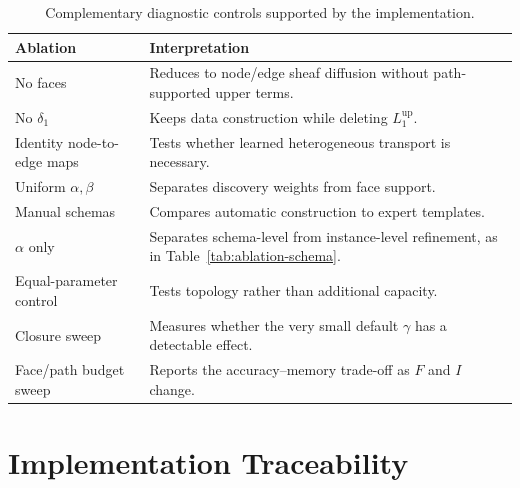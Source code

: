 \documentclass{article}
\begin{document}
\begin{table}[h]
  \centering
  \caption{Complementary diagnostic controls supported by the implementation.}
  \small
  \begin{tabularx}{\textwidth}{lX}
    \toprule
    \textbf{Ablation} & \textbf{Interpretation} \\
    \midrule
    No faces & Reduces to node/edge sheaf diffusion without path-supported upper terms. \\
    No $\delta_1$ & Keeps data construction while deleting $L_1^{\mathrm{up}}$. \\
    Identity node-to-edge maps & Tests whether learned heterogeneous transport is necessary. \\
    Uniform $\alpha,\beta$ & Separates discovery weights from face support. \\
    Manual schemas & Compares automatic construction to expert templates. \\
    $\alpha$ only & Separates schema-level from instance-level refinement, as in Table~\ref{tab:ablation-schema}. \\
    Equal-parameter control & Tests topology rather than additional capacity. \\
    Closure sweep & Measures whether the very small default $\gamma$ has a detectable effect. \\
    Face/path budget sweep & Reports the accuracy--memory trade-off as $F$ and $I$ change. \\
    \bottomrule
  \end{tabularx}
\end{table}

\section{Implementation Traceability}
\label{app:traceability}
\end{document}
